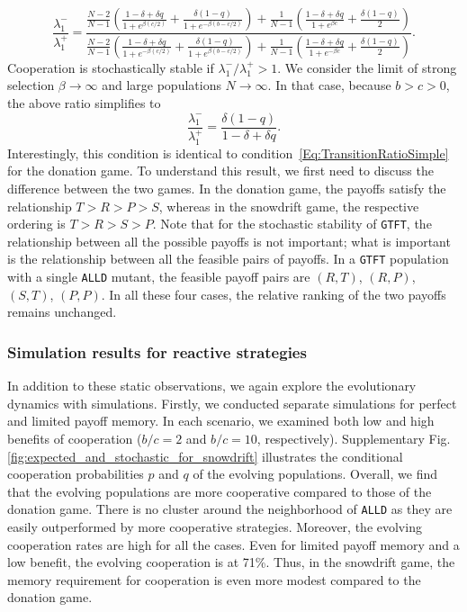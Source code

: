 \documentclass[11pt]{article}
\def\alld{\texttt{ALLD}}
\def\gtft{\texttt{GTFT}}
\theoremstyle{plainCl1}
\theoremstyle{plainCl2}
\begin{document}
\begin{equation*}
\frac{\lambda^{-}_1}{\lambda^{+}_1} = \frac{ \frac{N - 2}{N - 1}  
\left(\frac{ 1 - \delta + \delta q}{1+e^{ \beta (c/2)} } 
  + \frac{ \delta  \left(1 - q \right)}{1+ e^{-  \beta  \left(b - c/2 \right)}} \right)  
  +  \frac{1}{N-1}  \left(\frac{1 - \delta + \delta q}{1 + e^{\beta c}}
  + \frac{ \delta  \left(1 - q \right)}{2} \right)}
  { \frac{N - 2}{N - 1}  
\left( \frac{ 1 - \delta + \delta q}{1 + e^{-\beta (c/2)}}
+  \frac{ \delta  (1 - q)}{1 +e^{  \beta (b - c/2)}} \right) 
+  \frac{1}{N -1} \left(\frac{ 1 - \delta + \delta q}{1 + e^{-  \beta c}}
+  \frac{ \delta  \left(1 - q \right)}{2} \right)} .
\end{equation*}
Cooperation is stochastically stable if $\lambda^-_1/\lambda^+_1\!>\!1$. 
We consider the limit of strong selection \(\beta\! \rightarrow\! \infty\) and
large populations \(N \!\rightarrow \!\infty \). In that case, because $b\!>\!c\!>\!0$, the above ratio simplifies to
\begin{equation}\label{Eq:Condition_LimitedMemory_Snowdrift}
    \frac{\lambda^{-}_1}{\lambda^{+}_1} = \frac{\delta(1 - q)}{1 - \delta + \delta q}.
\end{equation}
Interestingly, this condition is identical to
condition~\eqref{Eq:TransitionRatioSimple} for the donation game. To understand
this result, we first need to discuss the difference between the two games. 
In the donation game, the payoffs satisfy the
relationship \(T \!>\! R \!>\! P \!>\! S\), whereas in the snowdrift game, the respective ordering is \(T \!>\! R \!>\! S
\!>\! P\).
Note that for the stochastic stability of \gtft, the relationship between all the
possible payoffs is not important; what is important is the relationship between
all the feasible pairs of payoffs. In a \gtft{} population  with a
single \alld{} mutant, the feasible payoff pairs are \((R, T)\), \((R,
P)\), \((S, T)\), \((P, P)\). In all these four cases, the relative ranking of the two payoffs remains unchanged.

\subsubsection{Simulation results for reactive strategies}\label{section:simulation_results_snowdrift}

In addition to these static observations, we again explore the evolutionary dynamics with simulations. 
Firstly, we conducted separate simulations for perfect and limited payoff memory. In each
scenario, we examined both low and high benefits of cooperation (\(b/c=2\) and
\(b/c=10\), respectively). Supplementary Fig.
\ref{fig:expected_and_stochastic_for_snowdrift} illustrates the conditional
cooperation probabilities \(p\) and \(q\) of the evolving populations. Overall,
we find that the evolving populations are more cooperative compared to those of
the donation game. There is no cluster around the neighborhood of \alld{} as
they are easily outperformed by more cooperative strategies. Moreover, the
evolving cooperation rates are high for all the cases. Even for limited
payoff memory and a low benefit, the evolving cooperation is at 71\%. Thus, 
in the snowdrift game, the memory requirement for cooperation is
even more modest compared to the donation game.
\end{document}
